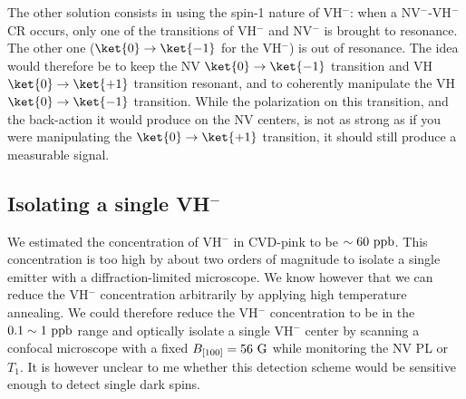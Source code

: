 \documentclass[a4paper,11pt]{report}
\begin{document}
\begin{refsection}
The other solution consists in using the spin-1 nature of VH$^-$: when a NV$^-$-VH$^-$ CR occurs, only one of the transitions of VH$^-$ and NV$^-$ is brought to resonance. The other one ($\ket{0} \to \ket{-1}$ for the VH$^-$) is out of resonance. The idea would therefore be to keep the NV $\ket{0} \to \ket{-1}$ transition and VH $\ket{0} \to \ket{+1}$ transition resonant, and to coherently manipulate the VH $\ket{0} \to \ket{-1}$ transition. While the polarization on this transition, and the back-action it would produce on the NV centers, is not as strong as if you were manipulating the $\ket{0} \to \ket{+1}$ transition, it should still produce a measurable signal.

\subsection{Isolating a single VH$^-$}

We estimated the concentration of VH$^-$ in CVD-pink to be $\sim 60\ \rm ppb$. This concentration is too high by about two orders of magnitude to isolate a single emitter with a diffraction-limited microscope. We know however that we can reduce the VH$^-$ concentration arbitrarily by applying high temperature annealing. We could therefore reduce the VH$^-$ concentration to be in the $0.1 \sim 1\ \rm ppb$ range and optically isolate a single VH$^-$ center by scanning a confocal microscope with a fixed $B_{[100]}=56\ \rm G$ while monitoring the NV PL or $T_1$. It is however unclear to me whether this detection scheme would be sensitive enough to detect single dark spins.

\printbibliography
\end{refsection}
\end{document}
